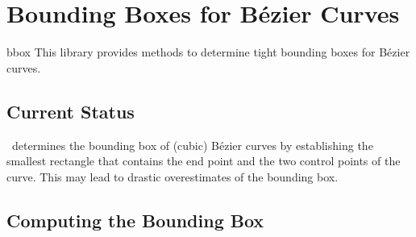 %
%
%


\section{Bounding Boxes for B\'ezier Curves}

\begin{pgflibrary}{bbox}
    This library provides methods to determine tight bounding boxes for
    B\'ezier curves.
\end{pgflibrary}


\subsection{Current Status}

\tikzname\ determines the bounding box of (cubic) B\'ezier curves by
establishing the smallest rectangle that contains the end point and the two
control points of the curve.  This may lead to drastic overestimates of the
bounding box.

\begin{codeexample}[]
\end{codeexample}

\subsection{Computing the Bounding Box}

